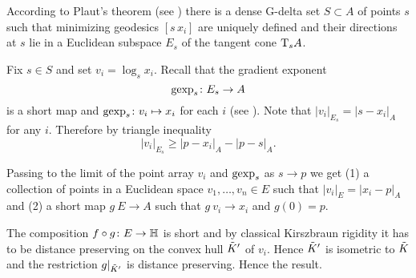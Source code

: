 According to Plaut's theorem (see \cite{AKP}) there is a dense G-delta set $S\subset A$ of points $s$ such that minimizing geodesics $[s\,x_i]$ are uniquely defined and their directions at $s$ lie in a Euclidean subspace $E_s$ of the tangent cone $\T_sA$.

Fix $s\in S$ and set $v_i=\log_sx_i$.
Recall that the gradient exponent 
\[\gexp_s\:E_s\to A\]
is a short map and $\gexp_s\:v_i\mapsto x_i$ for each $i$ (see \cite{AKP}).
Note that $|v_i|_{E_s}=|s-x_i|_A$ for any $i$.
Therefore by triangle inequality
\[|v_i|_{E_s}\ge |p-x_i|_A-|p-s|_A.\]

Passing to the limit of the point array $v_i$ and $\gexp_s$ as $s\to p$ we get (1) a collection of points in a Euclidean space $v_1,\dots,v_n\in E$ such that $|v_i|_E=|x_i-p|_A$
and (2) a short map $g\:E\to A$ such that $g\:v_i\to x_i$ and $g(0)=p$.

The composition $f\circ g\:E\to \HH$ is short
and by classical Kirszbraun rigidity it has to be distance preserving on the convex hull $\~K'$ of $v_i$.
Hence $\~K'$ is isometric to $\~K$ and the restriction $g|_{\~K'}$ is distance preserving. 
Hence the result.
\qeds
